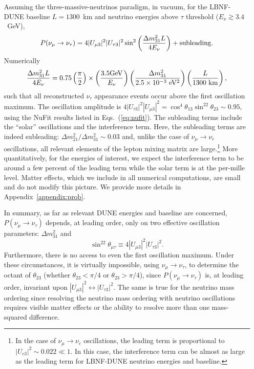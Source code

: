 \documentclass[aps,prd,onecolumn,nofootinbib,superscriptaddress, 11pt]{revtex4}
\begin{document}
Assuming the three-massive-neutrinos paradigm, in vacuum, for the LBNF-DUNE baseline $L=1300$~km and neutrino energies above $\tau$ threshold ($E_{\nu}\gtrsim 3.4$~GeV), 
\begin{equation}
P(\nu_\mu \to \nu_\tau) = 4|U_{\mu 3}|^2 |U_{\tau 3}|^2 \sin^2{\left(\frac{\Delta m_{31}^2 L}{4 E_\nu}\right)} + {\rm subleading}.
\label{eq:pmutau}
\end{equation}
Numerically
\begin{equation}
\frac{\Delta m_{31}^2 L}{4 E_\nu}=0.75\left(\frac{\pi}{2}\right)\times \left(\frac{3.5\rm GeV}{E_{\nu}}\right)\left(\frac{\Delta m^2_{31}}{2.5\times 10^{-3}~\rm eV^2}\right)\left(\frac{L}{1300~\rm km}\right),
\label{eq:phase}
\end{equation}
such that all reconstructed $\nu_{\tau}$ appearance events occur above the first oscillation maximum. The oscillation amplitude is $4|U_{\tau3}|^2|U_{\mu3}|^2=\cos^4\theta_{13}\sin^22\theta_{23}\sim 0.95$, using the NuFit results listed in Eqs.~(\ref{eq:nufit}). The subleading terms include the ``solar'' oscillations and the interference term. Here, the subleading terms are indeed subleading: $\Delta m^2_{21}/\Delta m^2_{31}\sim 0.03$ and, unlike the case of $\nu_\mu \to \nu_e$ oscillations, all relevant elements of the lepton mixing matrix are large.\footnote{In the case of $\nu_\mu \to \nu_e$ oscillations, the leading term is proportional to $|U_{e3}|^2\sim 0.022\ll 1$. In this case, the interference term can be almost as large as the leading term for LBNF-DUNE neutrino energies and baseline.} More quantitatively, for the energies of interest, we expect the interference term to be around a few percent of the leading term while the solar term is at the per-mille level. Matter effects, which we include in all numerical computations, are small and do not modify this picture. We provide more details in Appendix~\ref{appendix:prob}.

In summary, as far as relevant DUNE energies and baseline are concerned, $P(\nu_\mu \to \nu_\tau)$ depends, at leading order, only on two effective oscillation parameters: $\Delta m^2_{31}$ and 
\begin{equation}
\sin^22\theta_{\mu\tau}\equiv 4|U_{\mu 3}|^2 |U_{\tau 3}|^2.
\label{eq:sin2theta}
\end{equation}
Furthermore, there is no access to even the first oscillation maximum. Under these circumstances, it is virtually impossible, using $\nu_\mu \to \nu_\tau$, to determine the octant of $\theta_{23}$ (whether $\theta_{23} < \pi/4$ or $\theta_{23} > \pi/4$), since $P(\nu_\mu \to \nu_\tau)$ is, at leading order, invariant upon $|U_{\mu3}|^2\leftrightarrow|U_{\tau3}|^2$. The same is true for the neutrino mass ordering since resolving the neutrino mass ordering with neutrino oscillations requires visible matter effects or the ability to resolve more than one mass-squared difference.  
\end{document}
